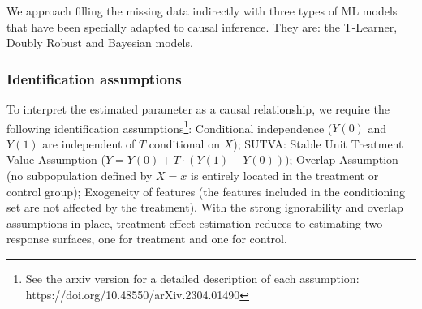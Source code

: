 \documentclass[12pt, a4paper]{article}
\begin{document}
We approach filling the missing data indirectly with three types of ML models
that have been specially adapted to causal inference. They are: the T-Learner,
Doubly Robust and Bayesian models. 

\subsubsection*{Identification assumptions}

To interpret the estimated parameter as a causal relationship, we require the following identification assumptions\footnote{See the arxiv version for a detailed description of each assumption: https://doi.org/10.48550/arXiv.2304.01490}:
Conditional independence ($Y(0)$ and $Y(1)$ are independent of $T$ conditional on $X$); SUTVA: Stable Unit Treatment Value Assumption ($Y = Y(0) + T \cdot (Y(1) - Y(0))$); Overlap Assumption (no subpopulation defined by $X = x$ is entirely located in the treatment or control group); Exogeneity of features (the features included in the conditioning set are not affected by the treatment). With the strong ignorability and overlap assumptions in place, treatment effect estimation reduces to estimating two response surfaces, one for treatment and one for control.



\end{document}
